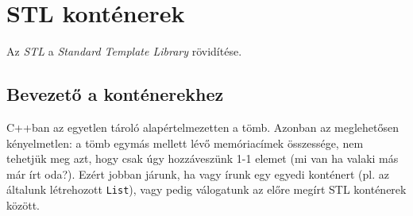 \documentclass[../cpp_book/cpp_book.tex]{subfiles}
\begin{document}
	\section{STL konténerek}
	
	Az \textit{STL} a \textit{Standard Template Library} rövidítése.
	\subsection{Bevezető a konténerekhez}
	C++ban az egyetlen tároló alapértelmezetten a tömb. Azonban az meglehetősen kényelmetlen: a tömb egymás mellett lévő memóriacímek összessége, nem tehetjük meg azt, hogy csak úgy hozzáveszünk 1-1 elemet (mi van ha valaki más már írt oda?). Ezért jobban járunk, ha vagy írunk egy egyedi konténert (pl. az általunk létrehozott \texttt{List}), vagy pedig válogatunk az előre megírt STL konténerek között.
	
\end{document}

